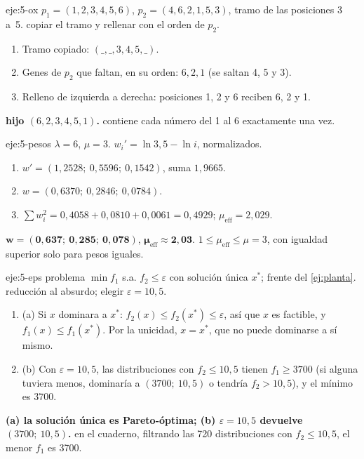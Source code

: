 \begin{solucion}{eje:5-ox}
\datos $p_1=(1,2,3,4,5,6)$, $p_2=(4,6,2,1,5,3)$, tramo de las posiciones 3 a~5.
\planteamiento copiar el tramo y rellenar con el orden de $p_2$.
\pasos
\begin{enumerate}[label=\arabic*.]
  \item Tramo copiado: $(\_,\_,3,4,5,\_)$.
  \item Genes de $p_2$ que faltan, en su orden: $6,2,1$ (se saltan 4, 5 y 3).
  \item Relleno de izquierda a derecha: posiciones 1, 2 y 6 reciben 6, 2 y 1.
\end{enumerate}
\resultado \textbf{hijo $(6,2,3,4,5,1)$.}
\comprobacion contiene cada número del 1 al 6 exactamente una vez.
\end{solucion}

\begin{solucion}{eje:5-pesos}
\datos $\lambda=6$, $\mu=3$.
\planteamiento $w_i'=\ln 3{,}5-\ln i$, normalizados.
\pasos
\begin{enumerate}[label=\arabic*.]
  \item $w'=(1{,}2528;\ 0{,}5596;\ 0{,}1542)$, suma $1{,}9665$.
  \item $w=(0{,}6370;\ 0{,}2846;\ 0{,}0784)$.
  \item $\sum w_i^{2}=0{,}4058+0{,}0810+0{,}0061=0{,}4929$; $\mu_{\mathrm{eff}}=2{,}029$.
\end{enumerate}
\resultado $\bm{w=(0{,}637;\ 0{,}285;\ 0{,}078)}$, $\bm{\mu_{\mathrm{eff}}\approx 2{,}03}$.
\comprobacion $1\le\mu_{\mathrm{eff}}\le\mu=3$, con igualdad superior solo para pesos iguales.
\end{solucion}

\begin{solucion}{eje:5-eps}
\datos problema $\min f_1$ s.a. $f_2\le\varepsilon$ con solución única $x^{*}$; frente del \cref{ej:planta}.
\planteamiento reducción al absurdo; elegir $\varepsilon=10{,}5$.
\pasos
\begin{enumerate}[label=\arabic*.]
  \item (a) Si $x$ dominara a $x^{*}$: $f_2(x)\le f_2(x^{*})\le\varepsilon$, así que $x$ es factible, y $f_1(x)\le f_1(x^{*})$. Por la unicidad, $x=x^{*}$, que no puede dominarse a sí mismo.
  \item (b) Con $\varepsilon=10{,}5$, las distribuciones con $f_2\le 10{,}5$ tienen $f_1\ge 3700$ (si alguna tuviera menos, dominaría a $(3700;\ 10{,}5)$ o tendría $f_2>10{,}5$), y el mínimo es $3700$.
\end{enumerate}
\resultado \textbf{(a) la solución única es Pareto-óptima; (b) $\varepsilon=10{,}5$ devuelve $(3700;\ 10{,}5)$.}
\comprobacion en el cuaderno, filtrando las 720 distribuciones con $f_2\le 10{,}5$, el menor $f_1$ es 3700.
\end{solucion}

